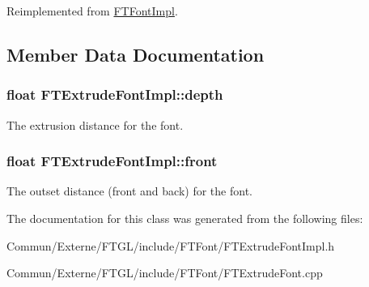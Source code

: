 Reimplemented from \hyperlink{class_f_t_font_impl}{F\+T\+Font\+Impl}.



\subsection{Member Data Documentation}
\subsubsection[{\texorpdfstring{depth}{depth}}]{\setlength{\rightskip}{0pt plus 5cm}float F\+T\+Extrude\+Font\+Impl\+::depth\hspace{0.3cm}{\ttfamily [private]}}\hypertarget{class_f_t_extrude_font_impl_a89d73f2c624a1624770ab65a2adc37bc}{}\label{class_f_t_extrude_font_impl_a89d73f2c624a1624770ab65a2adc37bc}
The extrusion distance for the font. 
\subsubsection[{\texorpdfstring{front}{front}}]{\setlength{\rightskip}{0pt plus 5cm}float F\+T\+Extrude\+Font\+Impl\+::front\hspace{0.3cm}{\ttfamily [private]}}\hypertarget{class_f_t_extrude_font_impl_a074ec35960eb5401384155803e9e7e5e}{}\label{class_f_t_extrude_font_impl_a074ec35960eb5401384155803e9e7e5e}
The outset distance (front and back) for the font. 

The documentation for this class was generated from the following files\+:\begin{DoxyCompactItemize}
\item 
Commun/\+Externe/\+F\+T\+G\+L/include/\+F\+T\+Font/F\+T\+Extrude\+Font\+Impl.\+h\item 
Commun/\+Externe/\+F\+T\+G\+L/include/\+F\+T\+Font/F\+T\+Extrude\+Font.\+cpp\end{DoxyCompactItemize}
